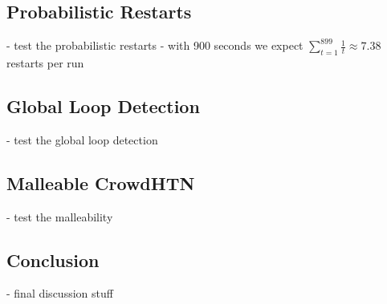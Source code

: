 \subsection{Probabilistic Restarts}
\label{eval: restarts}
- test the probabilistic restarts
- with 900 seconds we expect $\sum_{t=1}^{899} \frac{1}{t} \approx 7.38$ restarts per run


\subsection{Global Loop Detection}
\label{eval: global loop}
- test the global loop detection

\subsection{Malleable CrowdHTN}
\label{eval: malleable}
- test the malleability

\subsection{Conclusion}
\label{eval: conclusion}
- final discussion stuff
